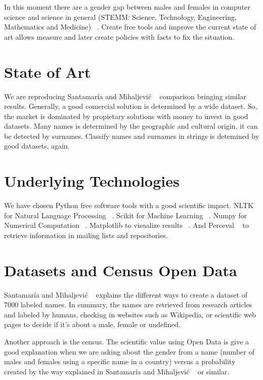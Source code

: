 \documentclass[runningheads]{llncs}
\begin{document}
In this moment there are a gender gap between males and females in
computer science and science in general (STEMM: Science, Technology,
Engineering, Mathematics and Medicine) ~\cite{holman2018gender}. Create
free tools and improve the current state of art allows measure and
later create policies with facts to fix the situation.

\section{State of Art}

We are reproducing Santamaría and Mihaljević
~\cite{10.7717/peerj-cs.156} comparison bringing similar
results. Generally, a good comercial solution is determined by a wide
dataset. So, the market is dominated by propietary solutions with
money to invest in good datasets. Many names is determined by the
geographic and cultural origin, it can be detected by
surnames. Classify names and surnames in strings is detemined by good
datasets, again.

\section{Underlying Technologies}

We have chosen Python free software tools with a good scientific
impact. NLTK for Natural Language Processing
~\cite{loper2002nltk}. Scikit for Machine Learning
~\cite{pedregosa2011scikit}. Numpy for Numerical Computation
~\cite{van2011numpy}. Matplotlib to visualize results
~\cite{hunter2007matplotlib}. And Perceval ~\cite{duenas2018perceval}
to retrieve information in mailing lists and repositories.

\section{Datasets and Census Open Data}

Santamaría and Mihaljević ~\cite{10.7717/peerj-cs.156} explains the
different ways to create a dataset of 7000 labeled names. In summary,
the names are retrieved from research articles and labeled by humans,
checking in websites such as Wikipedia, or scientific web pages to
decide if it's about a male, female or undefined.

Another approach is the census. The scientific value using Open Data
is give a good explanation when we are asking about the gender from a
name (number of males and females using a specific name in a country)
versus a probability created by the way explained in Santamaría and
Mihaljević ~\cite{10.7717/peerj-cs.156} or similar.
\end{document}
